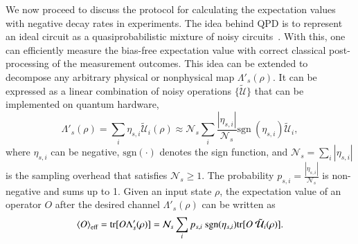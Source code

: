\documentclass[10pt, superscriptaddress,aps,pra,twocolumn,showpacs,nofootinbib, longbibliography, notitlepage,floatfix]{revtex4-2}
\begin{document}
We now proceed to discuss the protocol for calculating the expectation values with negative decay rates in experiments. The idea behind QPD is to represent an ideal circuit as a quasiprobabilistic mixture of noisy circuits~\cite{Gambetta2017PRL}. With this, one can efficiently measure the bias-free expectation value with correct classical post-processing of the measurement outcomes. This idea can be extended to decompose any arbitrary physical or nonphysical map $\Lambda'_s(\rho)$. It can be expressed as a linear combination of noisy operations $\{\mathcal{\tilde{U}}\}$ that can be implemented on quantum hardware, 
\begin{equation}
    \Lambda'_s(\rho) = \sum_i \eta_{s,i} \mathcal{\tilde{U}}_i(\rho) \approx \mathcal{N} _s \sum_i \frac{|\eta_{s,i}|}{\mathcal{N} _s} \text{sgn} ~ (\eta_{s,i}) \mathcal{\tilde{U}}_i,\label{samp_over}
\end{equation}
where $\eta_{s,i}$ can be negative, $\text{sgn}(\cdot)$ denotes the sign function, and $\mathcal{N} _s = \sum_i |\eta_{s,i}|$ is the sampling overhead that satisfies $\mathcal{N}_s \geq 1$. The probability $p_{s, i} = \frac{|\eta_{s,i}|}{\mathcal{N}_s}$ is non-negative and sums up to 1. Given an input state $\rho$, the expectation value of an operator $O$ after the desired channel $\Lambda'_s(\rho)$ can be written as
\begin{equation}
    \braket{O}_{\text{eff}} = \text{tr}[O\Lambda'_s(\rho)] = \mathcal{N}_s \sum_i p_{s,i} ~ \text{sgn} (\eta_{s,i}) \text{tr}[O~\mathcal{\tilde{U}}_i(\rho)]. \label{qpd_eqn}
\end{equation}
\end{document}
